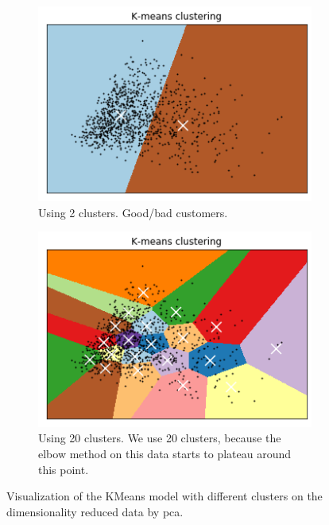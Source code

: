 \documentclass[runningheads]{llncs}
\begin{document}
\begin{figure}[h]
  \centering
  \begin{subfigure}[b]{0.49\textwidth}
    \includegraphics[width=\textwidth]{images/kmeans_pca_plot.png}
    \caption{Using 2 clusters. Good/bad customers.}
    \label{kmeans_pca_plot}
  \end{subfigure}
  \hfill
  \begin{subfigure}[b]{0.49\textwidth}
    \includegraphics[width=\textwidth]{images/kmeans_pca_optim_cluster.png}
    \caption{Using 20 clusters. We use 20 clusters, because the elbow method on this data starts to plateau around this point.}
    \label{kmeans_pca_optim_cluster}
  \end{subfigure}
  \caption{Visualization of the KMeans model with different clusters on the dimensionality reduced data by pca.}
\end{figure}
\end{document}
